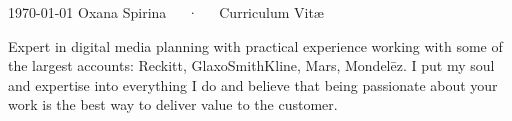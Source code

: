 \documentclass[11pt, a4paper]{awesome-cv}
\begin{document}
\makecvheader[C]

\makecvfooter
  {\today}
  {Oxana Spirina~~~·~~~Curriculum Vitæ}
  {\thepage}


%
%
%
%
%
%
%
%


\begin{cvparagraph}
	Expert in digital media planning with practical experience working with some of the largest accounts: Reckitt, GlaxoSmithKline, Mars, Mondelēz. I put my soul and expertise into everything I do and believe that being passionate about your work is the best way to deliver value to the customer.
\end{cvparagraph}
\end{document}
